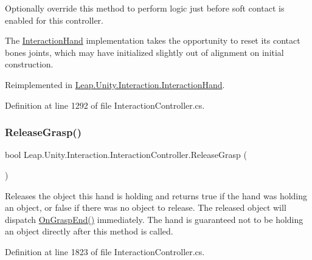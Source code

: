 Optionally override this method to perform logic just before soft contact is enabled for this controller. 

The \mbox{\hyperlink{class_leap_1_1_unity_1_1_interaction_1_1_interaction_hand}{Interaction\+Hand}} implementation takes the opportunity to reset its contact bone\textquotesingle{}s joints, which may have initialized slightly out of alignment on initial construction. 

Reimplemented in \mbox{\hyperlink{class_leap_1_1_unity_1_1_interaction_1_1_interaction_hand_a5fe00b0f12a6e91eecdf6472b2fa0775}{Leap.\+Unity.\+Interaction.\+Interaction\+Hand}}.



Definition at line 1292 of file Interaction\+Controller.\+cs.

\mbox{\label{class_leap_1_1_unity_1_1_interaction_1_1_interaction_controller_a3468a89e21c685d6df962ce70684c92f}} 
\subsubsection{\texorpdfstring{ReleaseGrasp()}{ReleaseGrasp()}\hspace{0.1cm}{\footnotesize\ttfamily [1/2]}}
{\footnotesize\ttfamily bool Leap.\+Unity.\+Interaction.\+Interaction\+Controller.\+Release\+Grasp (\begin{DoxyParamCaption}{ }\end{DoxyParamCaption})}



Releases the object this hand is holding and returns true if the hand was holding an object, or false if there was no object to release. The released object will dispatch \mbox{\hyperlink{class_leap_1_1_unity_1_1_interaction_1_1_interaction_controller_a1ff810c665a33a222e7d736ac224d839}{On\+Grasp\+End()}} immediately. The hand is guaranteed not to be holding an object directly after this method is called. 



Definition at line 1823 of file Interaction\+Controller.\+cs.

\mbox{\label{class_leap_1_1_unity_1_1_interaction_1_1_interaction_controller_a4f865088ea9a5504f0e965764e7514a8}} 

